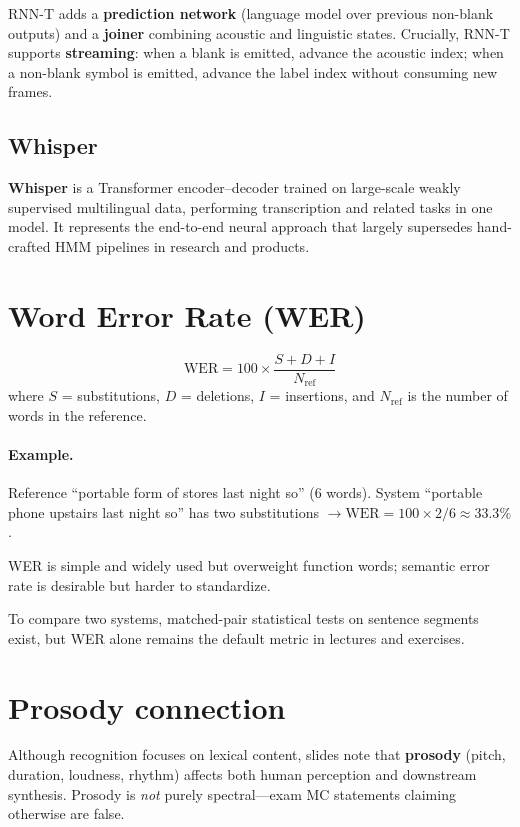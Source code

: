 RNN-T adds a \textbf{prediction network} (language model over previous non-blank outputs) and a \textbf{joiner} combining acoustic and linguistic states. Crucially, RNN-T supports \textbf{streaming}: when a blank is emitted, advance the acoustic index; when a non-blank symbol is emitted, advance the label index without consuming new frames. 

\subsection{Whisper}

\textbf{Whisper} is a Transformer encoder--decoder trained on large-scale weakly supervised multilingual data, performing transcription and related tasks in one model. It represents the end-to-end neural approach that largely supersedes hand-crafted HMM pipelines in research and products.

\section{Word Error Rate (WER)}


\[
\mathrm{WER} = 100 \times \frac{S + D + I}{N_{\mathrm{ref}}}
\]
where $S$ = substitutions, $D$ = deletions, $I$ = insertions, and $N_{\mathrm{ref}}$ is the number of words in the reference.

\paragraph{Example.} Reference ``portable form of stores last night so'' (6 words). System ``portable phone upstairs last night so'' has two substitutions $\rightarrow \mathrm{WER} = 100 \times 2/6 \approx 33.3\%$.

WER is simple and widely used but overweight function words; semantic error rate is desirable but harder to standardize.

To compare two systems, matched-pair statistical tests on sentence segments exist, but WER alone remains the default metric in lectures and exercises.

\section{Prosody connection}

Although recognition focuses on lexical content, slides note that \textbf{prosody} (pitch, duration, loudness, rhythm) affects both human perception and downstream synthesis. Prosody is \emph{not} purely spectral---exam MC statements claiming otherwise are false.

